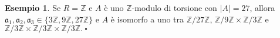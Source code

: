 \documentclass{article}
\theoremstyle{definition}
\newtheorem*{exm}{Esempio}
\begin{document}
\begin{exm}Se $R=\mathbb{Z}$ e $A$ è uno $\mathbb{Z}$-modulo di torsione con $|A|=27$, allora $\mathfrak{a}_1,\mathfrak{a_2},\mathfrak{a}_3\in \{3\mathbb{Z}, 9\mathbb{Z},27\mathbb{Z}\}$ e $A$ è isomorfo a uno tra $\mathbb{Z}/27\mathbb{Z}$, $\mathbb{Z}/9\mathbb{Z}\times \mathbb{Z}/3\mathbb{Z}$ e $\mathbb{Z}/3\mathbb{Z}\times \mathbb{Z}/3\mathbb{Z}\times \mathbb{Z}/3\mathbb{Z}. \ \square$\end{exm}
\end{document}
